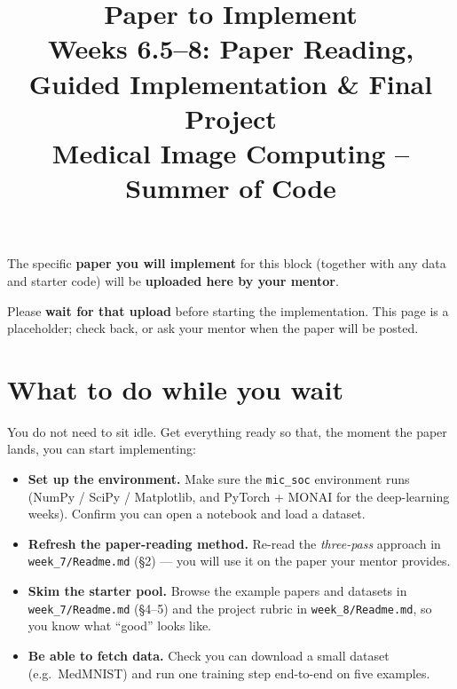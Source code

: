 \documentclass[11pt]{article}
\title{\textbf{Paper to Implement}\\[2pt]
\large Weeks 6.5--8: Paper Reading, Guided Implementation \& Final Project\\[6pt]
\normalsize Medical Image Computing -- Summer of Code}
\author{}
\date{}
\begin{document}
\maketitle
\vspace{-2.2em}

\begin{waitbox}
\large
The specific \textbf{paper you will implement} for this block (together with any
data and starter code) will be \textbf{uploaded here by your mentor}.

\smallskip
Please \textbf{wait for that upload} before starting the implementation. This page
is a placeholder; check back, or ask your mentor when the paper will be posted.
\end{waitbox}

\bigskip

\section{What to do while you wait}

You do not need to sit idle. Get everything ready so that, the moment the paper
lands, you can start implementing:

\begin{itemize}[leftmargin=*,nosep]
  \item \textbf{Set up the environment.} Make sure the \texttt{mic\_soc}
        environment runs (NumPy / SciPy / Matplotlib, and PyTorch + MONAI for the
        deep-learning weeks). Confirm you can open a notebook and load a dataset.
  \item \textbf{Refresh the paper-reading method.} Re-read the \emph{three-pass}
        approach in \texttt{week\_7/Readme.md} (\S2) --- you will use it on the
        paper your mentor provides.
  \item \textbf{Skim the starter pool.} Browse the example papers and datasets in
        \texttt{week\_7/Readme.md} (\S4--5) and the project rubric in
        \texttt{week\_8/Readme.md}, so you know what ``good'' looks like.
  \item \textbf{Be able to fetch data.} Check you can download a small dataset
        (e.g.\ MedMNIST) and run one training step end-to-end on five examples.
\end{itemize}

\end{document}
